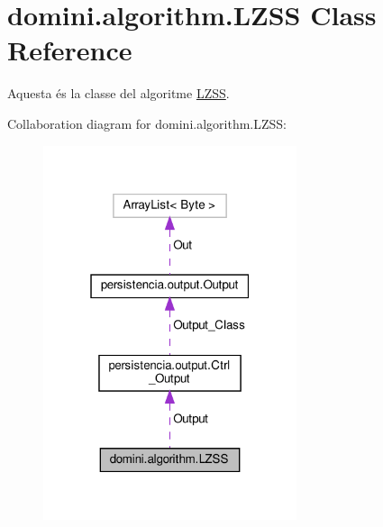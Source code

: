 \hypertarget{classdomini_1_1algorithm_1_1LZSS}{}\section{domini.\+algorithm.\+L\+Z\+SS Class Reference}
\label{classdomini_1_1algorithm_1_1LZSS}


Aquesta és la classe del algoritme \hyperlink{classdomini_1_1algorithm_1_1LZSS}{L\+Z\+SS}.  




Collaboration diagram for domini.\+algorithm.\+L\+Z\+SS\+:\nopagebreak
\begin{figure}[H]
\begin{center}
\leavevmode
\includegraphics[width=211pt]{classdomini_1_1algorithm_1_1LZSS__coll__graph}
\end{center}
\end{figure}
